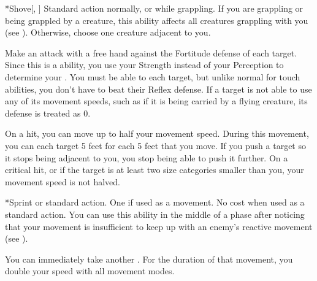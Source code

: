         \begin{activeability}*{Shove}[, ]
            \abilityusagetime Standard action normally, or  while grappling.
            \rankline
            If you are grappling or being grappled by a creature, this ability affects all creatures grappling with you (see ).
            Otherwise, choose one creature adjacent to you.

            Make an attack with a free hand against the Fortitude defense of each target.
            Since this is a  ability, you use your Strength instead of your Perception to determine your .
            You must be able to  each target, but unlike normal for touch abilities, you don't have to beat their Reflex defense.
            If a target is not able to use any of its movement speeds, such as if it is being carried by a flying creature, its defense is treated as 0.

            On a hit, you can move up to half your movement speed.
            During this movement, you can  each target 5 feet for each 5 feet that you move.
            If you push a target so it stops being adjacent to you, you stop being able to push it further.
            On a critical hit, or if the target is at least two size categories smaller than you, your movement speed is not halved.
        \end{activeability}

        \begin{activeability}*{Sprint}
            \abilityusagetime {} or standard action.
            \abilitycost One  if used as a movement. No cost when used as a standard action.
            \rankline
            You can use this ability in the middle of a phase after noticing that your movement is insufficient to keep up with an enemy's reactive movement (see ).

            You can immediately take another .
            For the duration of that movement, you double your speed with all movement modes.
        \end{activeability}

